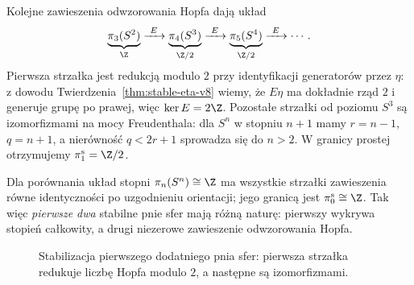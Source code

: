 \begin{przyklad}
\label{prz:eta-stabilizacja-v8}
Kolejne zawieszenia odwzorowania Hopfa dają układ
\[
 \underbrace{\pi_3(S^2)}_{\Z}
 \xrightarrow{\ E\ }
 \underbrace{\pi_4(S^3)}_{\Z/2}
 \xrightarrow{\ E\ }
 \underbrace{\pi_5(S^4)}_{\Z/2}
 \xrightarrow{\ E\ }\cdots.
\]
Pierwsza strzałka jest redukcją modulo $2$
przy identyfikacji generatorów przez $\eta$:
z dowodu Twierdzenia~\ref{thm:stable-eta-v8}
wiemy, że $E\eta$ ma dokładnie rząd $2$
i generuje grupę po prawej, więc
$\ker E=2\Z$.
Pozostałe strzałki od poziomu $S^3$ są
izomorfizmami na mocy Freudenthala:
dla $S^n$ w stopniu $n+1$ mamy
$r=n-1$, $q=n+1$, a nierówność
$q<2r+1$ sprowadza się do $n>2$.
W granicy prostej otrzymujemy
$\pi_1^{\mathrm s}=\Z/2$.

Dla porównania układ stopni
$\pi_n(S^n)\cong\Z$ ma wszystkie
strzałki zawieszenia równe identyczności
po uzgodnieniu orientacji; jego granicą
jest $\pi_0^{\mathrm s}\cong\Z$.
Tak więc \emph{pierwsze dwa} stabilne
pnie sfer mają różną naturę:
pierwszy wykrywa stopień całkowity,
a drugi niezerowe zawieszenie odwzorowania Hopfa.
\end{przyklad}

\begin{figure}[!htbp]
\centering
{}
\caption{Stabilizacja pierwszego dodatniego pnia sfer:
pierwsza strzałka redukuje liczbę Hopfa modulo $2$,
a następne są izomorfizmami.}
\label{fig:eta-stabilizacja-v8}
\end{figure}

